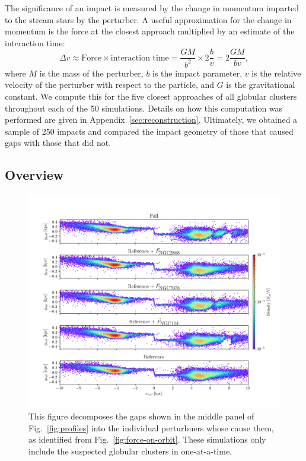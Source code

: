 \documentclass{aa}
\begin{document}
    The significance of an impact is measured by the change in momentum imparted to the stream stars by the perturber. A useful approximation for the change in momentum is the force at the closest approach multiplied by an estimate of the interaction time: \begin{equation} \label{eq:change_in_momentum} \Delta v \approx \text{Force} \times \text{interaction time} = \frac{GM}{b^2} \times 2\frac{b}{v} = 2\frac{GM}{bv}, \end{equation} where $M$ is the mass of the perturber, $b$ is the impact parameter, $v$ is the relative velocity of the perturber with respect to the particle, and $G$ is the gravitational constant. We compute this for the five closest approaches of all globular clusters throughout each of the 50 simulations. Details on how this computation was performed are given in Appendix~\ref{sec:reconstruction}. Ultimately, we obtained a sample of 250 impacts and compared the impact geometry of those that caused gaps with those that did not.


  \subsection*{Overview}

    \begin{figure}
      \centering
      \includegraphics[width=\linewidth]{decomposition-monte-carlo-009-with-3-gaps.png}
      \caption{This figure decomposes the gaps shown in the middle panel of Fig.~\ref{fig:profiles} into the individual perturbuers whose cause them, as identified from Fig.~\ref{fig:force-on-orbit}. These simulations only include the suspected globular clusters in one-at-a-time.}
      \label{fig:decomposition}
    \end{figure} 
\end{document}
